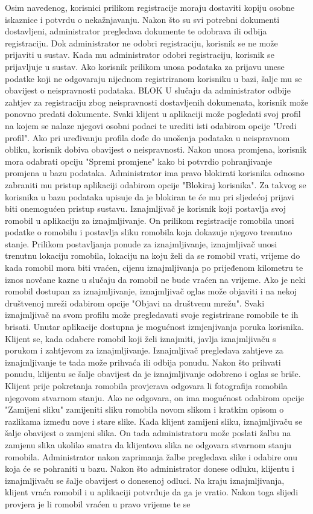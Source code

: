 		Osim navedenog, korisnici prilikom registracije moraju dostaviti kopiju osobne iskaznice i potvrdu o nekažnjavanju. Nakon što su svi potrebni dokumenti dostavljeni, administrator pregledava dokumente te odobrava ili odbija registraciju. Dok administrator ne odobri registraciju, korisnik se ne može prijaviti u sustav. Kada mu administrator odobri registraciju, korisnik se prijavljuje u sustav. Ako korisnik prilikom unosa podataka za prijavu unese podatke koji ne odgovaraju nijednom registriranom korisniku u bazi, šalje mu se obavijest o neispravnosti podataka. BLOK U slučaju da administrator odbije zahtjev za registraciju zbog neispravnosti dostavljenih dokumenata, korisnik može ponovno predati dokumente. Svaki klijent u aplikaciji može pogledati svoj profil na kojem se nalaze njegovi osobni podaci te urediti isti odabirom opcije "Uredi profil".  Ako pri uređivanju profila dođe do unošenja podataka u neispravnom obliku, korisnik dobiva obavijest o neispravnosti. Nakon unosa promjena, korisnik mora odabrati opciju "Spremi promjene" kako bi potvrdio pohranjivanje promjena u bazu podataka. Administrator ima pravo blokirati korisnika odnosno zabraniti mu pristup aplikaciji odabirom opcije "Blokiraj korisnika". Za takvog se korisnika u bazu podataka upisuje da je blokiran te će mu pri sljedećoj prijavi biti onemogućen pristup sustavu. Iznajmljivač je korisnik koji postavlja svoj romobil u aplikaciju za iznajmljivanje. On prilikom registracije romobila unosi podatke o romobilu i postavlja sliku romobila koja dokazuje njegovo trenutno stanje. Prilikom postavljanja ponude za iznajmljivanje, iznajmljivač unosi trenutnu lokaciju romobila, lokaciju na koju želi da se romobil vrati, vrijeme do kada romobil mora biti vraćen, cijenu iznajmljivanja po prijeđenom kilometru te iznos novčane kazne u slučaju da romobil ne bude vraćen na vrijeme. Ako je neki romobil dostupan za iznajmljivanje, iznajmljivač oglas može objaviti i na nekoj društvenoj mreži odabirom opcije "Objavi na društvenu mrežu". Svaki iznajmljivač na svom profilu može pregledavati svoje registrirane romobile te ih brisati. Unutar aplikacije dostupna je mogućnost izmjenjivanja poruka korisnika. Klijent se, kada odabere romobil koji želi iznajmiti, javlja iznajmljivaču s porukom i zahtjevom za iznajmljivanje. Iznajmljivač pregledava zahtjeve za iznajmljivanje te tada može prihvaća ili odbija ponudu. Nakon što prihvati ponudu, klijentu se šalje obavijest da je iznajmljivanje odobreno i oglas se briše. Klijent prije pokretanja romobila provjerava odgovara li fotografija romobila njegovom stvarnom stanju. Ako ne odgovara, on ima mogućnost odabirom opcije "Zamijeni sliku" zamijeniti sliku romobila novom slikom i kratkim opisom o razlikama između nove i stare slike. Kada klijent zamijeni sliku, iznajmljivaču se šalje obavijest o zamjeni slika. On tada administratoru može poslati žalbu na zamjenu slika ukoliko smatra da klijentova slika ne odgovara stvarnom stanju romobila. Administrator nakon zaprimanja žalbe pregledava slike i odabire onu koja će se pohraniti u bazu. Nakon što administrator donese odluku, klijentu i iznajmljivaču se šalje obavijest o donesenoj odluci. Na kraju iznajmljivanja, klijent vraća romobil i u aplikaciji potvrđuje da ga je vratio. Nakon toga slijedi provjera je li romobil vraćen u pravo vrijeme te se 